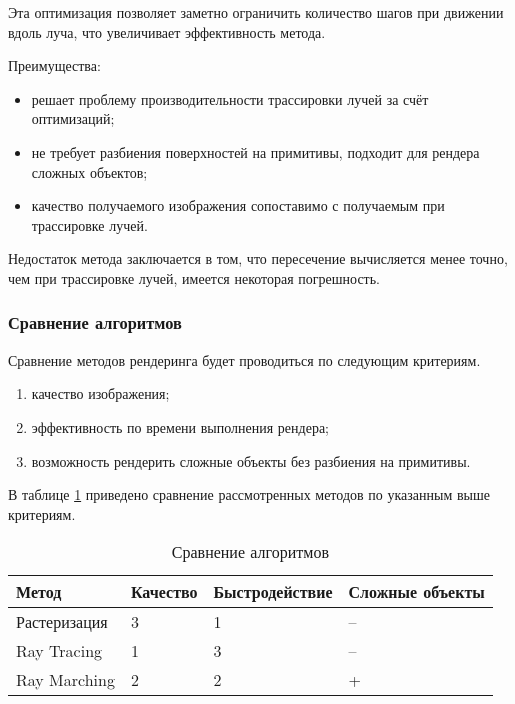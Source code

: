 Эта оптимизация позволяет заметно ограничить количество шагов при движении вдоль луча, что увеличивает эффективность метода.


Преимущества:
\begin{itemize}
  \item решает проблему производительности трассировки лучей за счёт оптимизаций;
  \item не требует разбиения поверхностей на примитивы, подходит для рендера сложных объектов;
  \item качество получаемого изображения сопоставимо с получаемым при трассировке лучей.
\end{itemize}

Недостаток метода заключается в том, что пересечение вычисляется менее точно,
чем при трассировке лучей, имеется некоторая погрешность.

\subsubsection{Сравнение алгоритмов}

Сравнение методов рендеринга будет проводиться по следующим критериям.
\begin{enumerate}
  \item качество изображения;
  \item эффективность по времени выполнения рендера;
  \item возможность рендерить сложные объекты без разбиения на примитивы.
\end{enumerate}

В таблице \ref{tbl:comp} приведено сравнение рассмотренных методов по указанным выше критериям.

\begin{table}[htbp]
	\centering
  \captionsetup{justification=centering}
	\caption{Сравнение алгоритмов}
	\label{tbl:comp}
  \begin{tabular}{|l|l|l|l|}
  \hline
  Метод        & Качество & Быстродействие & Сложные объекты \\ \hline
  Растеризация & 3        & 1              & --               \\ \hline
  Ray Tracing  & 1        & 3              & --               \\ \hline
  Ray Marching & 2        & 2              & +               \\ \hline
  \end{tabular}
\end{table}

